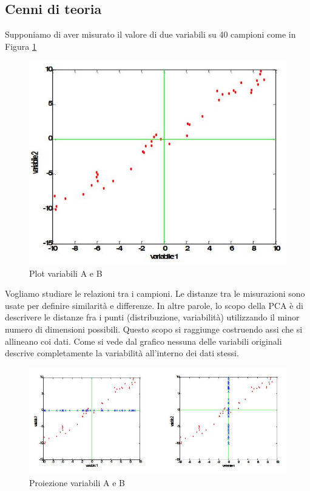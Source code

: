 \documentclass[12pt]{article}
\begin{document}
	\subsection{Cenni di teoria}
		Supponiamo di aver misurato il valore di due variabili su 40 campioni come in Figura \ref{fig:plot1} 
		\begin{figure}[H]
			\begin{center}
				\includegraphics[scale=.5]{plotTeoria}
				\caption{Plot variabili A e B}
				\label{fig:plot1}
			\end{center}
		\end{figure}
		Vogliamo studiare le relazioni tra i campioni. Le distanze tra le misurazioni sono usate per definire similarità e differenze. In altre parole, lo scopo della \ac{PCA} è di descrivere le distanze fra i punti (distribuzione, variabilità) utilizzando il minor numero di dimensioni possibili. Questo scopo si raggiunge costruendo assi che si allineano coi dati. Come si vede dal grafico nessuna delle variabili originali descrive completamente la variabilità all’interno dei dati stessi. 
		\begin{figure}[H]
			\begin{center}
				\includegraphics[scale=.6]{proiezione}
				\caption{Proiezione variabili A e B}
				\label{fig:proiezione}
			\end{center}
		\end{figure}
\end{document}
